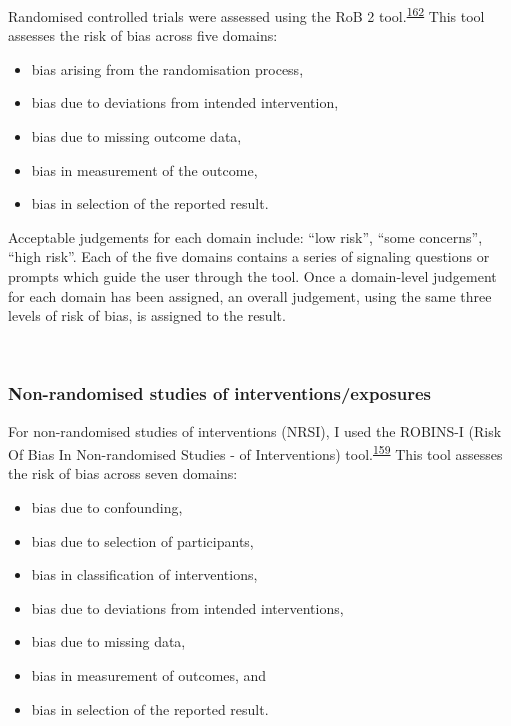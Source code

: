 \documentclass[a4paper, twoside]{templates/ociamthesis}
\providecommand{\tightlist}{%
  \setlength{\itemsep}{0pt}\setlength{\parskip}{0pt}}
\begin{document}
Randomised controlled trials were assessed using the RoB 2 tool.\textsuperscript{\protect\hyperlink{ref-sterne2019}{162}} This tool assesses the risk of bias across five domains:

\begin{itemize}
\tightlist
\item
  bias arising from the randomisation process,
\item
  bias due to deviations from intended intervention,
\item
  bias due to missing outcome data,
\item
  bias in measurement of the outcome,
\item
  bias in selection of the reported result.
\end{itemize}

Acceptable judgements for each domain include: ``low risk'', ``some concerns'', ``high risk''. Each of the five domains contains a series of signaling questions or prompts which guide the user through the tool. Once a domain-level judgement for each domain has been assigned, an overall judgement, using the same three levels of risk of bias, is assigned to the result.

~

\hypertarget{rob-tools-nrse}{%
\subsubsection{Non-randomised studies of interventions/exposures}\label{rob-tools-nrse}}

For non-randomised studies of interventions (NRSI), I used the ROBINS-I (Risk Of Bias In Non-randomised Studies - of Interventions) tool.\textsuperscript{\protect\hyperlink{ref-sterne2016}{159}} This tool assesses the risk of bias across seven domains:

\begin{itemize}
\tightlist
\item
  bias due to confounding,
\item
  bias due to selection of participants,
\item
  bias in classification of interventions,
\item
  bias due to deviations from intended interventions,
\item
  bias due to missing data,
\item
  bias in measurement of outcomes, and
\item
  bias in selection of the reported result.
\end{itemize}
\end{document}

